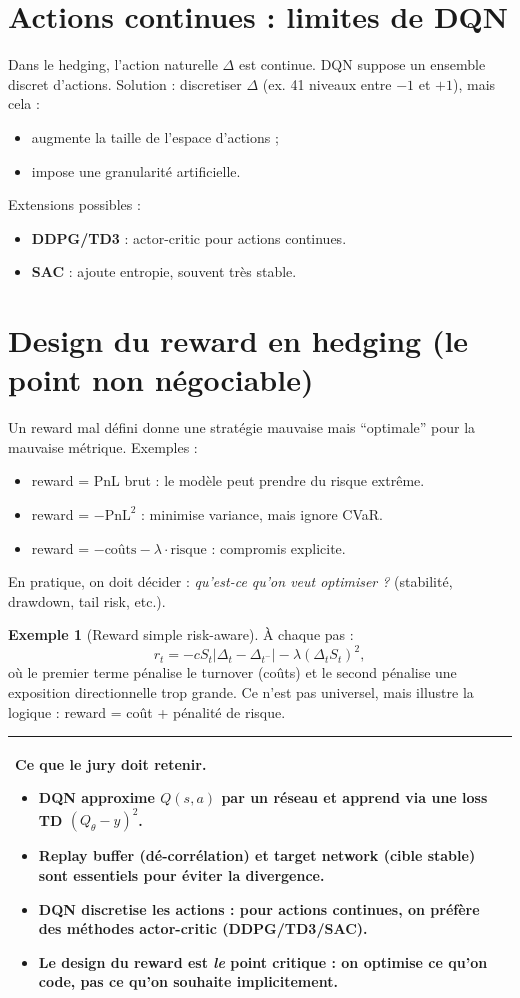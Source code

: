 \documentclass[11pt,a4paper]{report}
\newcommand{\1}{\mathbbm{1}}
\newcommand{\PnL}{\mathrm{PnL}}
\theoremstyle{definition}
\newtheorem{example}{Exemple}[chapter]
\theoremstyle{plain}
\theoremstyle{remark}
\newenvironment{jurybox}{%
  \begin{center}
  \setlength{\tabcolsep}{6pt}%
  \renewcommand{\arraystretch}{1.1}%
  \begin{tabular}{|p{0.94\textwidth}|}
  \hline
  \small\textbf{Ce que le jury doit retenir.}\par\medskip
}{%
  \\ \hline
  \end{tabular}
  \end{center}
}
\begin{document}
\section{Actions continues : limites de DQN}
Dans le hedging, l'action naturelle $\Delta$ est continue.
DQN suppose un ensemble discret d'actions.
Solution : discretiser $\Delta$ (ex. 41 niveaux entre $-1$ et $+1$), mais cela :
\begin{itemize}
  \item augmente la taille de l'espace d'actions ;
  \item impose une granularité artificielle.
\end{itemize}
Extensions possibles :
\begin{itemize}
  \item \textbf{DDPG/TD3} : actor-critic pour actions continues.
  \item \textbf{SAC} : ajoute entropie, souvent très stable.
\end{itemize}

\section{Design du reward en hedging (le point non négociable)}
Un reward mal défini donne une stratégie mauvaise mais ``optimale'' pour la mauvaise métrique.
Exemples :
\begin{itemize}
  \item reward = PnL brut : le modèle peut prendre du risque extrême.
  \item reward = $-\PnL^2$ : minimise variance, mais ignore CVaR.
  \item reward = $-\text{coûts} - \lambda \cdot \text{risque}$ : compromis explicite.
\end{itemize}
En pratique, on doit décider : \emph{qu'est-ce qu'on veut optimiser ?} (stabilité, drawdown, tail risk, etc.).

\begin{example}[Reward simple risk-aware]
À chaque pas :
\[
r_t = - c S_t|\Delta_t-\Delta_{t^-}| - \lambda(\Delta_t S_t)^2,
\]
où le premier terme pénalise le turnover (coûts) et le second pénalise une exposition directionnelle trop grande.
Ce n'est pas universel, mais illustre la logique : reward = coût + pénalité de risque.
\end{example}

\begin{jurybox}
\begin{itemize}
\item DQN approxime $Q(s,a)$ par un réseau et apprend via une loss TD $(Q_\theta - y)^2$.
\item Replay buffer (dé-corrélation) et target network (cible stable) sont essentiels pour éviter la divergence.
\item DQN discretise les actions : pour actions continues, on préfère des méthodes actor-critic (DDPG/TD3/SAC).
\item Le design du reward est \emph{le} point critique : on optimise ce qu'on code, pas ce qu'on souhaite implicitement.
\end{itemize}
\end{jurybox}
\end{document}
